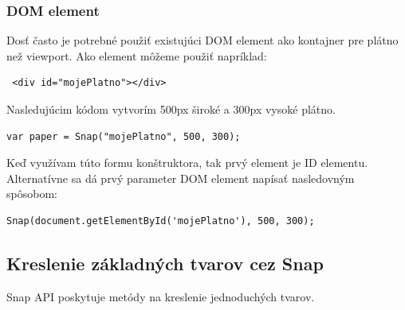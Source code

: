 \subsubsection{DOM element}

Dosť často je potrebné použiť existujúci DOM element ako kontajner pre plátno než viewport. Ako element môžeme použiť napríklad:
\begin{lstlisting}
 <div id="mojePlatno"></div>  
 \end{lstlisting}

Nasledujúcim kódom vytvorím 500px široké a 300px vysoké plátno.

\begin{lstlisting}
var paper = Snap("mojePlatno", 500, 300);
\end{lstlisting}

Keď využívam túto formu konštruktora, tak prvý element je ID elementu. Alternatívne sa dá prvý parameter DOM element napísať nasledovným spôsobom: 
\begin{lstlisting}
Snap(document.getElementById('mojePlatno'), 500, 300);
\end{lstlisting}

\newpage

\subsection{Kreslenie základných tvarov cez Snap}

Snap API poskytuje metódy na kreslenie jednoduchých tvarov. 

